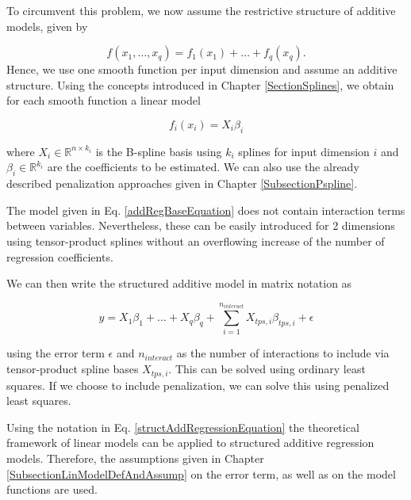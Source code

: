 \documentclass[10pt,a4paper]{article}
\begin{document}
To circumvent this problem, we now assume the restrictive structure of additive models, given by

\begin{equation} \label{addRegBaseEquation}
	f(x_1, \dots, x_q) = f_1(x_1) + \dots + f_q(x_q). 
\end{equation}
Hence, we use one smooth function per input dimension and assume an additive structure. \cite{fahrmeir2013regression} Using the concepts introduced in Chapter \ref{SectionSplines}, we obtain for each smooth function a linear model

$$f_i(x_i) = X_i \beta_i$$

where $X_i \in \mathbb R^{n \times k_i}$ is the B-spline basis using $k_i$ splines for input dimension $i$ and $\beta_i \in \mathbb R^{k_i}$ are the coefficients to be estimated. We can also use the already described penalization approaches given in Chapter \ref{SubsectionPspline}. 

The model given in Eq. \ref{addRegBaseEquation} does not contain interaction terms between variables. Nevertheless, these can be easily introduced for 2 dimensions using tensor-product splines without an overflowing increase of the number of regression coefficients.

We can then write the structured additive model in matrix notation as 

\begin{equation} \label{structAddRegressionEquation}
	y = X_1\beta_1 + \dots + X_q\beta_q + \sum_{i=1}^{n_{interact}} X_{tps, i} \beta_{tps,i} + \epsilon
\end{equation}

using the error term $\epsilon$ and $n_{interact}$ as the number of interactions to include via tensor-product spline bases $X_{tps,i}$. This can be solved using ordinary least squares. If we choose to include penalization, we can solve this using penalized least squares. 

Using the notation in Eq. \ref{structAddRegressionEquation} the theoretical framework of linear models can be applied to structured additive regression models. Therefore, the assumptions given in Chapter \ref{SubsectionLinModelDefAndAssump} on the error term, as well as on the model functions are used. \cite{fahrmeir2004penalized}


\printbibliography
	
\end{document}

